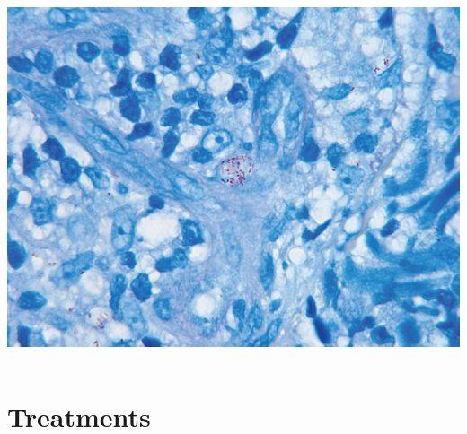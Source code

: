 \documentclass{beamer}
\begin{document}
\begin{frame}
\begin{columns}
				\includegraphics[height=.4\textheight,keepaspectratio]{fite-stain.jpg}
			\end{columns}
	\end{frame}
\section{Treatments}
\end{document}
